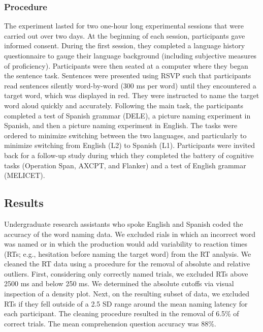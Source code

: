 \subsubsection{Procedure}
\label{procedure}

The experiment lasted for two one-hour long experimental sessions that were carried out over two days. At the beginning of each session, participants gave informed consent. During the first session, they completed a language history questionnaire to gauge their language background (including subjective measures of proficiency). Participants were then seated at a computer where they began the sentence task. Sentences were presented using RSVP such that participants read sentences silently word-by-word (300 ms per word) until they encountered a target word, which was displayed in red. They were instructed to name the target word aloud quickly and accurately. Following the main task, the participants completed a test of Spanish grammar (DELE), a picture naming experiment in Spanish, and then a picture naming experiment in English. The tasks were ordered to minimize switching between the two languages, and particularly to minimize switching from English (L2) to Spanish (L1). Participants were invited back for a follow-up study during which they completed the battery of cognitive tasks (Operation Span, AXCPT, and Flanker) and a test of English grammar (MELICET).

\subsection{Results}
\label{results}

Undergraduate research assistants who spoke English and Spanish coded the accuracy of the word naming data. We excluded rials in which an incorrect word was named or in which the production would add variability to reaction times (RTs; e.g., hesitation before naming the target word) from the RT analysis. We cleaned the RT data using a procedure for the removal of absolute and relative outliers. First, considering only correctly named trials, we excluded RTs above 2500 ms and below 250 ms. We determined the absolute cutoffs via visual inspection of a density plot. Next, on the resulting subset of data, we excluded RTs if they fell outside of a 2.5 SD range around the mean naming latency for each participant. The cleaning procedure resulted in the removal of 6.5\% of correct trials. The mean comprehension question accuracy was 88\%.

